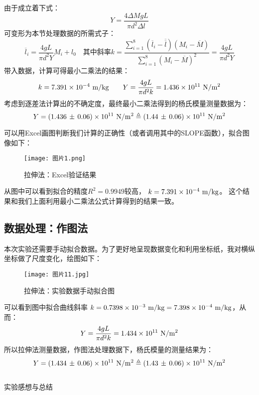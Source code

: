 \documentclass[11pt]{article}
\begin{document}
由于成立着下式：
\[
    Y=\frac{4\Delta M gL}{\pi d^2\Delta l} 
\]
可变形为本节处理数据的所需式子：
\[
    \overline l_i=\frac{4gL}{\pi d^2Y}M_i +l_0
     \quad \text{其中斜率}
     k=\frac{\sum_{i=1}^8(\overline l_i-
     \overline{\overline l})(M_i-\overline M)}
     {\sum_{i=1}^8(M_i-\overline M)^2}
     =\frac{4gL}{\pi d^2Y}
\]
带入数据，计算可得最小二乘法的结果：
\[
   k= 7.391\times 10^{-4}\,\,{\rm m/kg} 
   \qquad Y= \frac{4gL}{\pi d^2k}=1.436\times10^{11}\,\,{\rm N/m^2}
\]
考虑到逐差法计算出的不确定度，最终最小二乘法得到的杨氏模量测量数据为：
\[
   Y=(1.436\,\pm\,0.06) \times10^{11}\,\,{\rm N/m^2}\triangleq (1.44\,\pm \,0.06)\times10^{11}\,\,{\rm N/m^2}
\]









可以用Excel画图判断我们计算的正确性（或者调用其中的SLOPE函数），拟合图像如下：

\begin{figure}[H]
        \centering
        \texttt{[image: 图片1.png]}
        \caption{拉伸法：Excel验证结果}
    \end{figure}
从图中可以看到拟合的精度$R^2=0.9949$较高，
$k=7.391\times 10^{-4}\,\,{\rm m/kg} $。
这个结果和我们上面利用最小二乘法公式计算得到的结果一致。

\subsection{数据处理：作图法}

本次实验还需要手动拟合数据。为了更好地呈现数据变化和利用坐标纸，我对横纵坐标做了尺度变化，绘图如下：

\begin{figure}[H]
    \centering
    \texttt{[image: 图片11.jpg]}
    \caption{拉伸法：实验数据手动拟合图}
\end{figure}

可以看到图中拟合曲线斜率
$k=0.7398\times 10^{-3}\,\,{\rm m/kg}=7.398\times 10^{-4}
\,\,{\rm m/kg}$，从而：
\[
    Y= \frac{4gL}{\pi d^2k}=1.434\times10^{11}\,\,{\rm N/m^2}
\]
所以拉伸法测量数据，作图法处理数据下，杨氏模量的测量结果为：
\[
   Y=(1.434\,\pm\,0.06) \times10^{11}\,\,{\rm N/m^2}\triangleq (1.43\,\pm \,0.06)\times10^{11}\,\,{\rm N/m^2}
\]


\subsection[拉伸法测量杨氏模量：实验总结 ]{}
\begin{center}
    \begin{tcolorbox}[colback=gray!10,%
                      colframe=black,%
                      width=5cm,%
                      arc=1mm, auto outer arc,
                      boxrule=0.5pt,
                     ]
                     \begin{center}
                    实验感想与总结      
                     \end{center}
    \end{tcolorbox}
\end{center}
\end{document}
